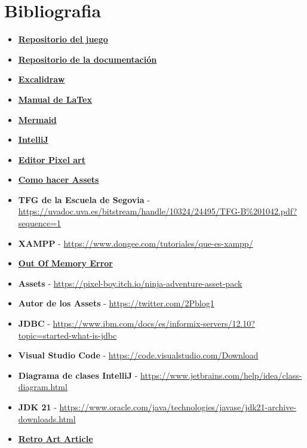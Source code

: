 \documentclass[a4paper]{article}
\begin{document}
\section{Bibliografia}
\begin{itemize}
    \item \textbf{\href{https://github.com/Pisa-17/TFG-DAM-Eldoria/tree/main}{Repositorio del juego}}
    \item \textbf{\href{https://github.com/Pisa-17/documentationEldoriaTFG/tree/main}{Repositorio de la documentación}}
    \item \textbf{\href{https://excalidraw.com/}{Excalidraw}}
    \item \textbf{\href{https://manualdelatex.com/}{Manual de LaTex}}
    \item \textbf{\href{https://mermaid.js.org/intro/getting-started.html}{Mermaid}}
    \item \textbf{\href{https://www.jetbrains.com/es-es/idea/}{IntelliJ}}
    \item \textbf{\href{https://www.piskelapp.com/}{Editor Pixel art}}
    \item \textbf{\href{https://tips.clip-studio.com/es-es/articles/2484}{Como hacer Assets}}
    \item \textbf{TFG de la Escuela de Segovia} - \url{https://uvadoc.uva.es/bitstream/handle/10324/24495/TFG-B%201042.pdf?sequence=1}
    \item \textbf{XAMPP} - \url{https://www.dongee.com/tutoriales/que-es-xampp/}
    \item \textbf{\href{https://stackoverflow.com/questions/1596009/java-lang-outofmemoryerror-java-heap-space}{Out Of Memory Error}}
    \item \textbf{Assets} - \url{https://pixel-boy.itch.io/ninja-adventure-asset-pack}
    \item \textbf{Autor de los Assets} - \url{https://twitter.com/2Pblog1}
    \item \textbf{JDBC} - \url{https://www.ibm.com/docs/es/informix-servers/12.10?topic=started-what-is-jdbc}
    \item \textbf{Visual Studio Code} - \url{https://code.visualstudio.com/Download}
    \item \textbf{Diagrama de clases IntelliJ} - \url{https://www.jetbrains.com/help/idea/class-diagram.html}
    \item \textbf{JDK 21} - \url{https://www.oracle.com/java/technologies/javase/jdk21-archive-downloads.html}
    \item \textbf{\href{https://medium.com/@dq_irfandi/the-nostalgia-effect-how-retro-games-influence-modern-gaming-8925be77694e}{Retro Art Article}}

\end{itemize}
\end{document}
